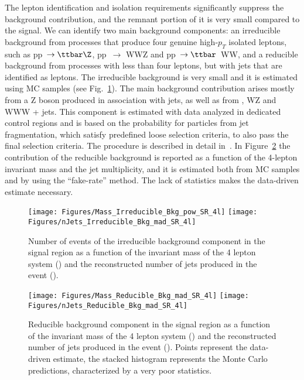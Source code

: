 The lepton identification and isolation requirements significantly suppress the background contribution, and the remnant portion of it is very small compared to the signal.
We can identify two main background components: an irreducible background from processes that produce four genuine high-$p_T$ isolated leptons, such as pp~$\to \ttbar\Z$, pp~$\to$ WWZ and pp~$\to \ttbar$~WW,  and a reducible background from processes with less than four leptons, but with jets that are identified as leptons. The irreducible background is very small and it is estimated using MC samples (see Fig.~\ref{fig:irr_bkg}).
The main background contribution arises mostly from a Z boson produced in association with jets, as well as from \ttbar, WZ and WWW + jets. This component is estimated with data analyzed in dedicated control regions and is based on the probability for particles from jet fragmentation, which satisfy predefined loose selection criteria, to also pass the final selection criteria. The procedure is described in detail in~\cite{ZZXSPaper}. In Figure~\ref{fig:red_bkg} the contribution of the reducible background is reported as a function of the 4-lepton invariant mass and the jet multiplicity, and it is estimated both from MC samples and by using the ``fake-rate'' method. The lack of statistics makes the data-driven estimate necessary.
\begin{figure}[hbtp]
  \begin{center}
\texttt{[image: Figures/Mass\_Irreducible\_Bkg\_pow\_SR\_4l]}
\texttt{[image: Figures/nJets\_Irreducible\_Bkg\_mad\_SR\_4l]}
     \caption{Number of events of the irreducible background component in the signal region as a function of the invariant mass of the 4 lepton system (\cmsLeft) and the reconstructed number of jets produced in the event (\cmsRight).}
    \label{fig:irr_bkg}
  \end{center}
\end{figure}
\begin{figure}[hbtp]
  \begin{center}
    \texttt{[image: Figures/Mass\_Reducible\_Bkg\_mad\_SR\_4l]}
    \texttt{[image: Figures/nJets\_Reducible\_Bkg\_mad\_SR\_4l]}
     \caption{Reducible background component in the signal region as a function of the invariant mass of the 4 lepton system (\cmsLeft) and the reconstructed number of jets produced in the event (\cmsRight). Points represent the data-driven estimate, the stacked histogram represents the Monte Carlo predictions, characterized by a very poor statistics.}
    \label{fig:red_bkg}
  \end{center}
\end{figure}
